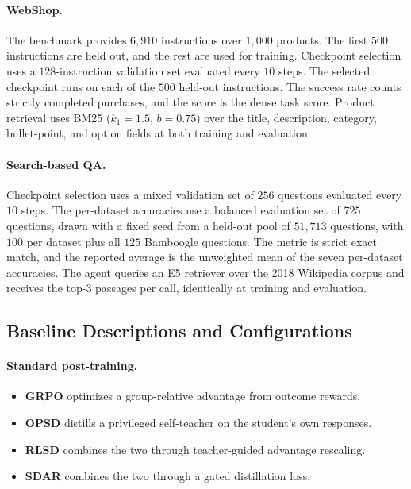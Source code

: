 \paragraph{WebShop.} The benchmark provides $6{,}910$ instructions over $1{,}000$ products. The first $500$ instructions are held out, and the rest are used for training. Checkpoint selection uses a $128$-instruction validation set evaluated every $10$ steps. The selected checkpoint runs on each of the $500$ held-out instructions. The success rate counts strictly completed purchases, and the score is the dense task score. Product retrieval uses BM25 ($k_1=1.5$, $b=0.75$) over the title, description, category, bullet-point, and option fields at both training and evaluation.

\paragraph{Search-based QA.} Checkpoint selection uses a mixed validation set of $256$ questions evaluated every $10$ steps. The per-dataset accuracies use a balanced evaluation set of $725$ questions, drawn with a fixed seed from a held-out pool of $51{,}713$ questions, with $100$ per dataset plus all $125$ Bamboogle questions. The metric is strict exact match, and the reported average is the unweighted mean of the seven per-dataset accuracies. The agent queries an E5 retriever \citep{wang2022e5} over the 2018 Wikipedia corpus and receives the top-$3$ passages per call, identically at training and evaluation.

\subsection{Baseline Descriptions and Configurations}
\label{app:baseline_details}

\paragraph{Standard post-training.}
\begin{itemize}
\item \textbf{GRPO} \citep{shao2024deepseekmath} optimizes a group-relative advantage from outcome rewards.
\item \textbf{OPSD} \citep{zhao2026opsd} distills a privileged self-teacher on the student's own responses.
\item \textbf{RLSD} \citep{yang2026rlsd} combines the two through teacher-guided advantage rescaling.
\item \textbf{SDAR} \citep{lu2026sdar} combines the two through a gated distillation loss.
\end{itemize}

